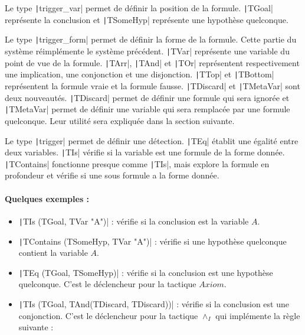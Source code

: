 \documentclass[french,titlepage]{article}
\begin{document}
Le type \texttt|trigger_var| permet de définir la position de la formule. \texttt|TGoal| représente la conclusion et \texttt|TSomeHyp| représente une hypothèse quelconque.

Le type \texttt|trigger_form| permet de définir la forme de la formule. Cette partie du système réimplémente le système précédent. \texttt|TVar| représente une variable du point de vue de la formule. \texttt|TArr|, \texttt|TAnd| et \texttt|TOr| représentent respectivement une implication, une conjonction et une disjonction. \texttt|TTop| et \texttt|TBottom| représentent la formule vraie et la formule fausse. \texttt|TDiscard| et \texttt|TMetaVar| sont deux nouveautés. \texttt|TDiscard| permet de définir une formule qui sera ignorée et \texttt|TMetaVar| permet de définir une variable qui sera remplacée par une formule quelconque. Leur utilité sera expliquée dans la section suivante.

Le type \texttt|trigger| permet de définir une détection. \texttt|TEq| établit une égalité entre deux variables. \texttt|TIs| vérifie si la variable est une formule de la forme donnée. \texttt|TContains| fonctionne presque comme \texttt|TIs|, mais explore la formule en profondeur et vérifie si une sous formule a la forme donnée.

\paragraph{Quelques exemples :} \label{realisation:langage_detecter:syntaxe:exemples}
\begin{itemize}
    \item \texttt|TIs (TGoal, TVar "A")| : vérifie si la conclusion est la variable $A$.
    \item \texttt|TContains (TSomeHyp, TVar "A")| : vérifie si une hypothèse quelconque contient la variable $A$.
    \item \texttt|TEq (TGoal, TSomeHyp)| : vérifie si la conclusion est une hypothèse quelconque. C'est le déclencheur pour la tactique $Axiom$.
    \item \texttt|TIs (TGoal, TAnd(TDiscard, TDiscard))| :
          vérifie si la conclusion est une conjonction. C'est le déclencheur
          pour la tactique $\land_I$ qui implémente la règle suivante :
          \begin{mathpar}
          \end{mathpar}
\end{itemize}
\end{document}
